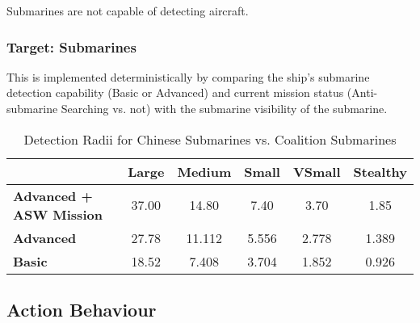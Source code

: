 \documentclass{article}
\begin{document}
            Submarines are not capable of detecting aircraft. \\
            
    \subsubsection{Target: Submarines}
                        
        This is implemented deterministically by comparing the ship's submarine detection capability (Basic or Advanced) and current mission status (Anti-submarine Searching vs. not) with the submarine visibility of the submarine. \\
 
        \begin{table}[h!]
            \centering
            \begin{tabular}{lccccc}
                \hline
                & \textbf{Large} & \textbf{Medium} & \textbf{Small} & \textbf{VSmall} & \textbf{Stealthy} \\
                \hline
                \textbf{Advanced + ASW Mission} & 37.00  & 14.80   & 7.40   & 3.70   & 1.85   \\
                \textbf{Advanced}               & 27.78  & 11.112  & 5.556  & 2.778  & 1.389  \\
                \textbf{Basic}                  & 18.52  & 7.408   & 3.704  & 1.852  & 0.926  \\
                \hline
            \end{tabular}
            \caption{Detection Radii for Chinese Submarines vs. Coalition Submarines}
            \label{ChineseSubmarinesvs.CoalitionSubmarines}
        \end{table}

\subsection{Action Behaviour}
\end{document}
